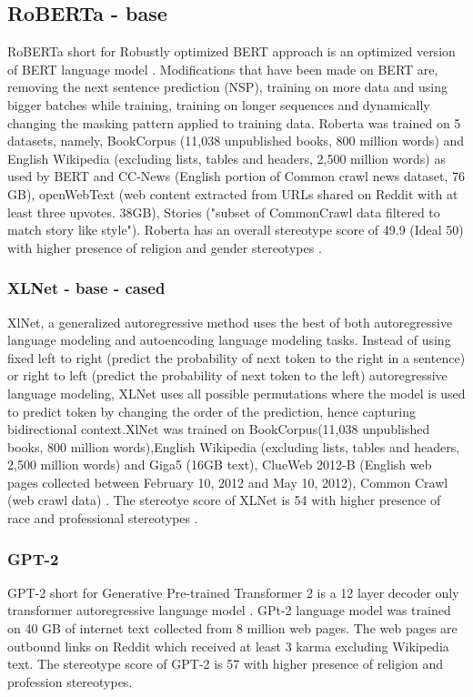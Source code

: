 \subsection{RoBERTa - base}
RoBERTa short for Robustly optimized BERT approach is an optimized version of BERT language model \cite{liu2019roberta}. Modifications that have been made on BERT are, removing the next sentence prediction (NSP), training on more data and using bigger batches while training, training on longer sequences and dynamically changing the masking pattern applied to training data\cite{liu2019roberta}.  Roberta was trained on 5 datasets, namely, BookCorpus (11,038 unpublished books, 800 million words) and English Wikipedia (excluding lists, tables and headers, 2,500 million words) as used by BERT and CC-News (English portion of Common crawl news dataset, 76 GB), openWebText (web content extracted from URLs shared on Reddit with at least three upvotes. 38GB), Stories ("subset of CommonCrawl data filtered to match story like style")\cite{liu2019roberta}. Roberta has an overall stereotype score of 49.9 (Ideal 50) with higher presence of religion and gender stereotypes \cite{nadeem2020stereoset}.  

\subsubsection{XLNet - base - cased }
XlNet, a generalized autoregressive method uses the best of both autoregressive language modeling and autoencoding language modeling tasks. Instead of using fixed left to right (predict the probability of next token to the right in a sentence) or right to left (predict the probability of next token to the left) autoregressive language modeling, XLNet uses all possible permutations where the model is used to predict token by changing the order of the prediction, hence capturing bidirectional context\cite{yang2019xlnet}.XlNet was trained on BookCorpus(11,038 unpublished books, 800 million words),English Wikipedia (excluding lists, tables and headers, 2,500 million words) and  Giga5 (16GB text), ClueWeb 2012-B (English web pages collected between February 10, 2012 and May 10, 2012), Common Crawl (web crawl data) \cite{yang2019xlnet}. The stereotye score of XLNet is 54 with higher presence of race and professional stereotypes \cite{nadeem2020stereoset}.
\subsubsection{GPT-2}
GPT-2 short for Generative Pre-trained Transformer 2 is a 12 layer decoder only transformer autoregressive language model \cite{radford2019language}. GPt-2 language model was trained on 40 GB of internet text collected from 8 million web pages. The web pages are outbound links on Reddit which received at least 3 karma excluding Wikipedia text. The stereotype score of GPT-2 is 57 with higher presence of religion and profession stereotypes. 

